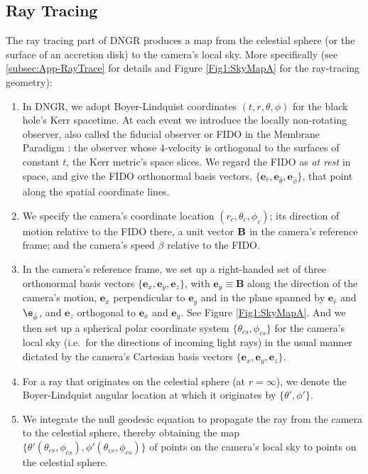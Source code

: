 \documentclass[12pt]{iopart}
\newcommand{\mb}[1]{{\mathbf#1}} %
\begin{document}
\subsection{Ray Tracing}
\label{subsec:RayTracing}

The ray tracing part of DNGR produces a map from the celestial sphere (or the surface of an accretion disk) to the camera's local sky.  More specifically (see \ref{subsec:App-RayTrace}
for details and Figure \ref{Fig1:SkyMapA} for the ray-tracing geometry):

\begin{enumerate}
\item In DNGR, we adopt Boyer-Lindquist coordinates $(t,r,\theta,\phi)$ for the black hole's Kerr
spacetime.  At each event we introduce the locally non-rotating observer, also called
the fiducial observer or FIDO in the Membrane Paradigm \cite{MP}: the observer
whose 4-velocity is orthogonal to the surfaces of constant $t$, the Kerr metric's
space slices.  We regard the
FIDO as \emph{at rest} in space, and give the FIDO orthonormal basis vectors, 
$\{\mb e_{\hat r}, \mb e_{\hat \theta}, \mb e_{\hat \phi}\}$, that
point along the spatial coordinate lines. 
\item
We specify the camera's coordinate location $(r_c,\theta_c,\phi_c)$;
its direction of motion relative to the FIDO there, a unit vector $\bf B$ in the camera's reference
frame; and the camera's speed $\beta$ relative to the FIDO.
\item
In the camera's reference frame, we set up a right-handed set of three orthonormal basis 
vectors $\{\mb e_x, \mb e_y, \mb e_z\}$, 
with $\mb e_y \equiv \mb B$ along the direction of the camera's motion, $\mb e_x$
perpendicular to $\mb e_y$ and in the plane spanned by $\mb e_{\hat r}$ and 
$\e_{\hat \phi}$, and $\mb e_z$ orthogonal to $\mb e_x$ and $\mb e_y$.  See
Figure \ref{Fig1:SkyMapA}.  And we then set up a spherical polar coordinate system
$\{\theta_{cs}, \phi_{cs}\}$ for the camera's local sky (i.e.\ for the directions of
incoming light rays) in the usual manner dictated
by the camera's Cartesian basis vectors $\{\mb e_x, \mb e_y, \mb e_z\}$. 
\item
For a ray that  originates on
the celestial sphere (at $r=\infty$), we denote  the Boyer-Lindquist 
angular location at which it originates by $\{\theta',\phi'\}$.
\item
We integrate the null geodesic equation to propagate the ray from the camera to
the celestial sphere, thereby obtaining the map $\{ \theta'(\theta_{cs}, \phi_{cs} ),\phi'(\theta_{cs}, \phi_{cs} ) \}$ of points on the camera's local sky to points on the celestial sphere.

\end{enumerate}
\end{document}
